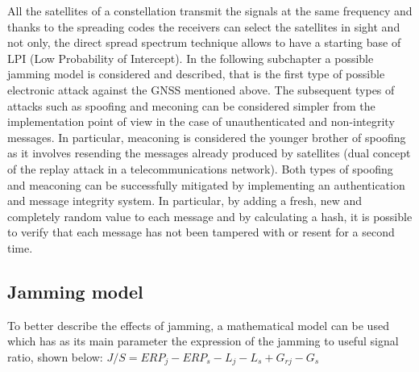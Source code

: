 \documentclass[12pt]{report}
\begin{document}
All the satellites of a constellation transmit the signals at the same frequency and thanks to the spreading codes the receivers can select the satellites in sight and not only, the direct spread spectrum technique allows to have a starting base of LPI (Low Probability of Intercept).
In the following subchapter a possible jamming model is considered and described, that is the first type of possible electronic attack against the GNSS mentioned above. The subsequent types of attacks such as spoofing and meconing can be considered simpler from the implementation point of view in the case of unauthenticated and non-integrity messages. In particular, meaconing is considered the younger brother of spoofing as it involves resending the messages already produced by satellites (dual concept of the replay attack in a telecommunications network). Both types of spoofing and meaconing can be successfully mitigated by implementing an authentication and message integrity system. In particular, by adding a fresh, new and completely random value to each message and by calculating a hash, it is possible to verify that each message has not been tampered with or resent for a second time.

\subsection{Jamming model}
To better describe the effects of jamming, a mathematical model can be used which has as its main parameter the expression of the jamming to useful signal ratio, shown below: $J/S = ERP_{j} - ERP_{s} - L_{j} - L_{s} + G_{rj} - G_{s}$ 
\end{document}
